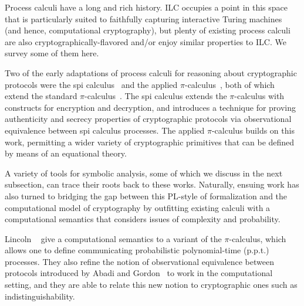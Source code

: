 Process calculi have a long and rich history. ILC occupies a point in this space
that is particularly suited to faithfully capturing interactive Turing machines
(and hence, computational cryptography), but plenty of existing process calculi
are also cryptographically-flavored and/or enjoy similar properties to ILC. We
survey some of them here.

Two of the early adaptations of process calculi for reasoning about
cryptographic protocols were the spi calculus~\cite{abadi1999calculus} and the
applied $\pi$-calculus~\cite{abadi2001mobile}, both of which extend the standard
$\pi$-calculus~\cite{milner1999communicating}. The spi calculus extends the
$\pi$-calculus with constructs for encryption and decryption, and introduces a
technique for proving authenticity and secrecy properties of cryptographic
protocols via observational equivalence between spi calculus processes. The
applied $\pi$-calculus builds on this work, permitting a wider variety of
cryptographic primitives that can be defined by means of an equational theory.


A variety of tools for symbolic analysis, some of which we discuss in the next
subsection, can trace their roots back to these works. Naturally, ensuing work
has also turned to bridging the gap between this PL-style of formalization and
the computational model of cryptography by outfitting existing calculi with
a computational semantics that considers issues of complexity and probability.

Lincoln \etal~\cite{lincoln1998probabilistic} give a computational semantics to
a variant of the $\pi$-calculus, which allows one to define communicating
probabilistic polynomial-time (p.p.t.) processes. They also refine the notion of
observational equivalence between protocols introduced by Abadi and
Gordon~\cite{abadi1999calculus} to work in the computational setting, and they
are able to relate this new notion to cryptographic ones such as
indistinguishability.


